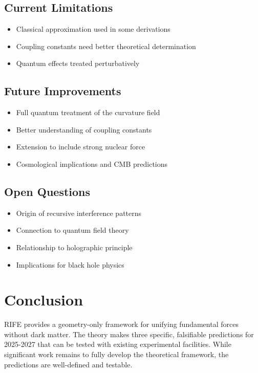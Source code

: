 \documentclass[11pt]{article}
\begin{document}
\subsection{Current Limitations}
\begin{itemize}
\item Classical approximation used in some derivations
\item Coupling constants need better theoretical determination
\item Quantum effects treated perturbatively
\end{itemize}

\subsection{Future Improvements}
\begin{itemize}
\item Full quantum treatment of the curvature field
\item Better understanding of coupling constants
\item Extension to include strong nuclear force
\item Cosmological implications and CMB predictions
\end{itemize}

\subsection{Open Questions}
\begin{itemize}
\item Origin of recursive interference patterns
\item Connection to quantum field theory
\item Relationship to holographic principle
\item Implications for black hole physics
\end{itemize}

\section{Conclusion}

RIFE provides a geometry-only framework for unifying fundamental forces without dark matter. The theory makes three specific, falsifiable predictions for 2025-2027 that can be tested with existing experimental facilities. While significant work remains to fully develop the theoretical framework, the predictions are well-defined and testable.
\end{document}
